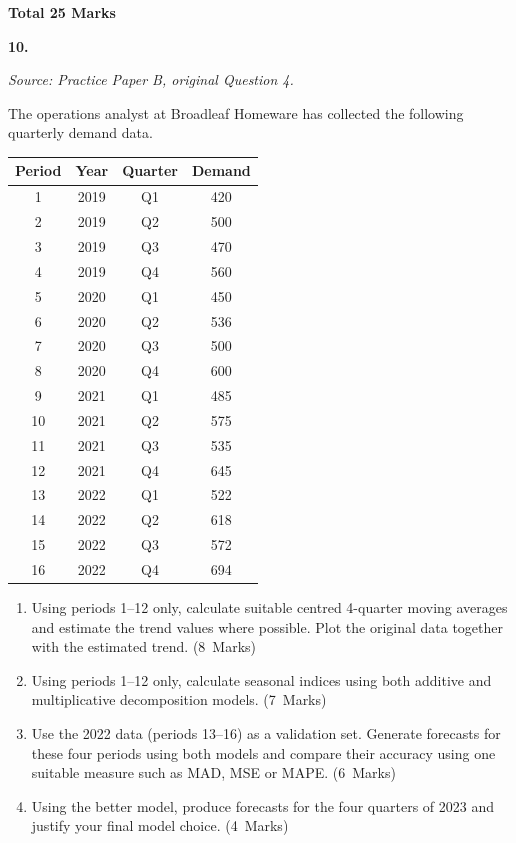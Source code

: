 \documentclass[11pt,a4paper]{article}
\newcommand{\markalloc}[1]{\nobreak\hfill\mbox{(#1 Marks)}}
\newcommand{\questiontotal}[1]{\begin{flushright}\textbf{Total #1 Marks}\end{flushright}}
\begin{document}
\questiontotal{25}

\newpage

\textbf{10.}

\textit{Source: Practice Paper B, original Question 4.}



The operations analyst at Broadleaf Homeware has collected the following quarterly demand data.

\begin{center}
\begin{tabular}{cccc}
\toprule
Period & Year & Quarter & Demand \\
\midrule
1  & 2019 & Q1 & 420 \\
2  & 2019 & Q2 & 500 \\
3  & 2019 & Q3 & 470 \\
4  & 2019 & Q4 & 560 \\
5  & 2020 & Q1 & 450 \\
6  & 2020 & Q2 & 536 \\
7  & 2020 & Q3 & 500 \\
8  & 2020 & Q4 & 600 \\
9  & 2021 & Q1 & 485 \\
10 & 2021 & Q2 & 575 \\
11 & 2021 & Q3 & 535 \\
12 & 2021 & Q4 & 645 \\
13 & 2022 & Q1 & 522 \\
14 & 2022 & Q2 & 618 \\
15 & 2022 & Q3 & 572 \\
16 & 2022 & Q4 & 694 \\
\bottomrule
\end{tabular}
\end{center}

\begin{enumerate}
\item Using periods 1--12 only, calculate suitable centred 4-quarter moving averages and estimate the trend values where possible. Plot the original data together with the estimated trend. \markalloc{8}

\item Using periods 1--12 only, calculate seasonal indices using both additive and multiplicative decomposition models. \markalloc{7}

\item Use the 2022 data (periods 13--16) as a validation set. Generate forecasts for these four periods using both models and compare their accuracy using one suitable measure such as MAD, MSE or MAPE. \markalloc{6}

\item Using the better model, produce forecasts for the four quarters of 2023 and justify your final model choice. \markalloc{4}
\end{enumerate}
\end{document}
